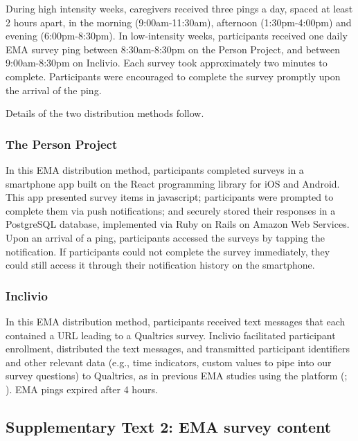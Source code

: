 \documentclass[
]{article}
\begin{document}
During high intensity weeks, caregivers received three pings a day,
spaced at least 2 hours apart, in the morning (9:00am-11:30am),
afternoon (1:30pm-4:00pm) and evening (6:00pm-8:30pm). In low-intensity
weeks, participants received one daily EMA survey ping between
8:30am-8:30pm on the Person Project, and between 9:00am-8:30pm on
Inclivio. Each survey took approximately two minutes to complete.
Participants were encouraged to complete the survey promptly upon the
arrival of the ping.

Details of the two distribution methods follow.

\subsubsection*{The Person Project}\label{the-person-project}

In this EMA distribution method, participants completed surveys in a
smartphone app built on the React programming library for iOS and
Android. This app presented survey items in javascript; participants
were prompted to complete them via push notifications; and securely
stored their responses in a PostgreSQL database, implemented via Ruby on
Rails on Amazon Web Services. Upon an arrival of a ping, participants
accessed the surveys by tapping the notification. If participants could
not complete the survey immediately, they could still access it through
their notification history on the smartphone.

\subsubsection*{Inclivio}\label{inclivio}

In this EMA distribution method, participants received text messages
that each contained a URL leading to a Qualtrics survey. Inclivio
facilitated participant enrollment, distributed the text messages, and
transmitted participant identifiers and other relevant data (e.g., time
indicators, custom values to pipe into our survey questions) to
Qualtrics, as in previous EMA studies using the platform
(;
). EMA pings
expired after 4 hours.

\subsection*{Supplementary Text 2: EMA survey
content}\label{supplementary-text-2-ema-survey-content}
\end{document}
